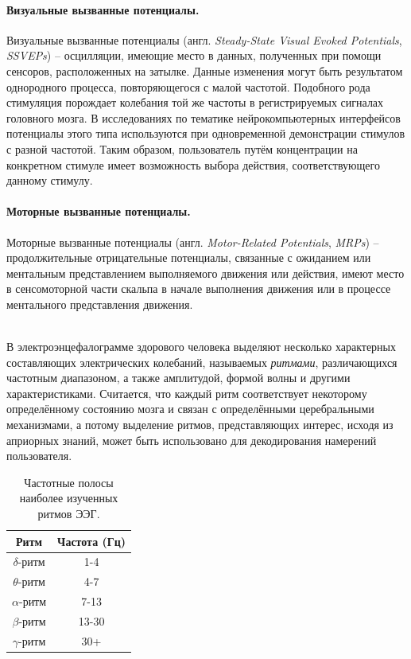\documentclass[12pt,a4paper,oneside,fleqn,leqno]{article}
\newcounter{pe} %
\newcommand*{\Nep}{\addtocounter{pe}{1}{\arabic{pe}$^{\circ}$.\;}}
\newcommand*{\NepS}{\mbox{} \\ \Nep}
\begin{document}
	\paragraph{Визуальные вызванные потенциалы.}
	\par Визуальные вызванные потенциалы (англ. {\it Steady-State Visual Evoked Potentials}, {\it SSVEPs}) -- осцилляции, имеющие место в данных, полученных при помощи сенсоров, расположенных на затылке. Данные изменения могут быть результатом однородного процесса, повторяющегося с малой частотой. Подобного рода стимуляция порождает колебания той же частоты в регистрируемых сигналах головного мозга. В исследованиях по тематике нейрокомпьютерных интерфейсов потенциалы этого типа используются при одновременной демонстрации стимулов с разной частотой. Таким образом, пользователь путём концентрации на конкретном стимуле имеет возможность выбора действия, соответствующего данному стимулу.\\
	\paragraph{Моторные вызванные потенциалы.}
	\par Моторные вызванные потенциалы (англ. {\it Motor-Related Potentials}, {\it MRPs}) -- продолжительные отрицательные потенциалы, связанные с ожиданием или ментальным представлением выполняемого движения или действия, имеют место в сенсомоторной части скальпа в начале выполнения движения или в процессе ментального представления движения.
	\\ \NepS {\bf Частотная мозговая активность}
	\par В электроэнцефалограмме здорового человека выделяют несколько характерных составляющих электрических колебаний, называемых {\it ритмами}, различающихся частотным диапазоном, а также амплитудой, формой волны и другими характеристиками. Считается, что каждый ритм соответствует некоторому определённому состоянию мозга и связан с определёнными церебральными механизмами, а потому выделение ритмов, представляющих интерес, исходя из априорных знаний, может быть использовано для декодирования намерений пользователя.

\begin{table}[h]
\centering
\begin{tabular}{|c|c|}
\hline
Ритм & Частота (Гц) \\ \hline
$\delta$-ритм & 1-4 \\ \hline
$\theta$-ритм & 4-7 \\ \hline
$\alpha$-ритм & 7-13 \\ \hline
$\beta$-ритм & 13-30 \\ \hline
$\gamma$-ритм &  30+ \\ \hline
\end{tabular}
\caption{Частотные полосы наиболее изученных ритмов ЭЭГ.}
\end{table}
\end{document}
